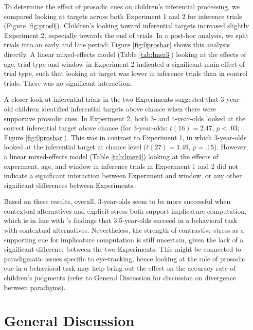 \documentclass[10pt,letterpaper]{article}
\begin{document}
To determine the effect of prosodic cues on children's inferential processing, we compared looking at targets across both Experiment 1 and 2 for inference trials (Figure \ref{fig:pros0}). Children's looking toward inferential targets increased slightly Experiment 2, especially towards the end of trials. In a post-hoc analysis, we split trials into an early and late period; Figure \ref{fig:0prosbar} shows this analysis directly. A linear mixed-effects model (Table \ref{tab:lmer3}) looking at the effects of age, trial type and window in Experiment 2 indicated a significant main effect of trial type, such that looking at target was lower in inference trials than in control trials. There was no significant interaction.

A closer look at inferential trials in the two Experiments suggested that 3-year-old children identified inferential targets above chance when there were supportive prosodic cues. In Experiment 2, both 3- and 4-year-olds looked at the correct inferential target above chance (for 3-year-olds: $t(16) = 2.47$, $p < .03$; Figure \ref{fig:0prosbar}). This was in contrast to Experiment 1, in which 3-year-olds looked at the inferential target at chance level ($t(27) = 1.49$, $p = .15$). However, a linear mixed-effects model (Table \ref{tab:lmer4}) looking at the effects of experiment, age, and window in inference trials in Experiment 1 and 2 did not indicate a significant interaction between Experiment and window, or any other significant differences between Experiments. 

Based on these results, overall, 3-year-olds seem to be more successful when contextual alternatives and explicit stress both support implicature computation, which is in line with 's findings that 3.5-year-olds succeed in a behavioral task with contextual alternatives. Nevertheless, the strength of contrastive stress as a supporting cue for implicature computation is still uncertain, given the lack of a significant difference between the two Experiments. This might be connected to paradigmatic issues specific to eye-tracking, hence looking at the role of prosodic cue in a behavioral task may help bring out the effect on the accuracy rate of children's judgments (refer to General Discussion for discussion on divergence between paradigms). %

\section{General Discussion}
\end{document}

